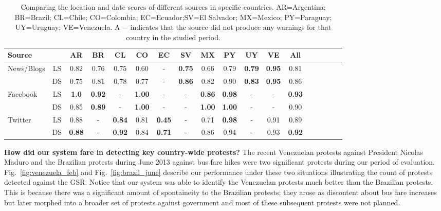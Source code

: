 \begin{table*} %
  \small
\centering
\caption{\small Comparing the location and date scores of different sources in specific countries.
AR=Argentina; BR=Brazil; CL=Chile; CO=Colombia; EC=Ecuador;SV=El Salvador; MX=Mexico; PY=Paraguay; UY=Uruguay; VE=Venezuela. A $-$ indicates that the source did not produce any warnings for that country in the studied period.}
\label{tb:modelwisecomparison}
\begin{tabular}{|l|*{17}{c|}}
\hline
Source& & AR & BR & CL & CO & EC & SV & MX & PY & UY & VE & All\\
\hline
\multirow{2}{*}{News/Blogs} &LS &0.82&0.76&0.75&0.60&-&{\bf0.75}&0.66&0.79&{\bf0.79}&{\bf0.95}&0.81\\
                            &DS&0.75&0.81&0.78&0.77&-&{\bf0.86}&0.82&0.90&{\bf0.83}&{\bf0.95}&0.86\\
\hline
\multirow{2}{*}{Facebook} &LS &{\bf1.0}&{\bf0.92}&-&{\bf1.00}&-&-&{\bf0.86}&{\bf0.98}&-&-&{\bf0.93}\\
                          &DS&0.85&{\bf0.89}&-&{\bf1.00}&-&-&{\bf1.00}&{\bf1.00}&-&-&0.90\\
\hline
\multirow{2}{*}{Twitter} &LS &0.88&-&{\bf0.84}&0.81&{\bf0.45}&-&0.71&{\bf0.98}&-&0.91&0.89\\
                         &DS&{\bf0.88}&-&{\bf0.92}&0.84&{\bf0.71}&-&0.86&0.94&-&0.93&{\bf0.92}\\
\hline
\end{tabular}
\end{table*}

\noindent
{\bf How did our system fare in detecting key country-wide protests?}
The recent Venezuelan protests against President Nicolas Maduro and the Brazilian protests during June 2013 against bus fare hikes were two significant protests during our period of evaluation. Fig.~\ref{fig:venezuela_feb} and
Fig.~\ref{fig:brazil_june} describe our performance under these two situations illustrating the count
of protests detected against the GSR. Notice that our system was able to 
identify the Venezuelan protests much better than the Brazilian protests. This is because there was a significant amount
of spontaineity to the Brazilian protests; they arose as discontent about bus fare increases but later morphed into a broader
set of protests against government and most of these subsequent protests were not planned.\\

